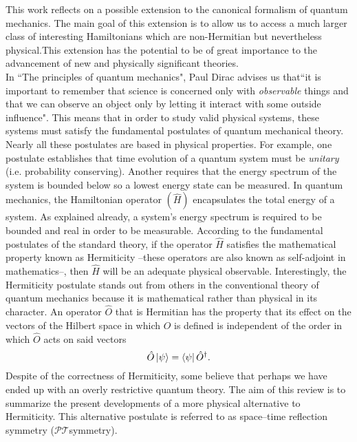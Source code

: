 \documentclass[12pt, a4paper]{report}
\newcommand\PT{\(\mathcal{PT}\)}
\begin{document}
This work reflects on a possible extension to the canonical formalism of quantum mechanics. The main goal of this extension is to allow us to access a much larger class of interesting Hamiltonians which are non-Hermitian but nevertheless physical.This extension has the potential to be of great importance to the advancement of new and physically significant theories.\\
In ``The principles of quantum mechanics", Paul Dirac advises us that``it is important to remember that science is concerned only with \textit{observable} things and that we can observe an object only by letting it interact with some outside influence"\cite{POQM}. This means that in order to study valid physical systems, these systems must satisfy the fundamental postulates of quantum mechanical theory. Nearly all these postulates are based in physical properties. For example, one postulate establishes that time evolution of a quantum system must be \textit{unitary} (i.e. probability conserving). Another requires that the energy spectrum of the system is bounded below so a lowest energy state can be measured. In quantum mechanics, the Hamiltonian operator $(\hat{H})$ encapsulates the total energy of a system. As explained already, a system's energy spectrum is required to be bounded and real in order to be measurable. According to the fundamental postulates of the standard theory, if the operator $\hat{H}$ satisfies the mathematical property known as Hermiticity --these operators are also known as self-adjoint in mathematics--, then $\hat{H}$ will be an adequate physical observable. Interestingly, the Hermiticity postulate stands out from others in the conventional theory of quantum mechanics because it is mathematical rather than physical in its character\cite{MakingSense}.
An operator $\hat{O}$ that is Hermitian has the property that its effect on the vectors of the Hilbert space in which $\hat{O}$ is defined is independent of the order in which $\hat{O}$ acts on said vectors\cite{Jones-Smith}
\begin{equation}\label{eq:1}
\hat{O}\ket{\psi} = \bra{\psi}\hat{O}^{\dagger}.
\end{equation}
Despite of the correctness of Hermiticity, some believe that perhaps we have ended up with an overly restrictive quantum theory.  
The aim of this review is to summarize the present developments of a more physical alternative to Hermiticity. This alternative postulate is referred to as space–time reflection symmetry (\PT\:symmetry)\cite{MustaHbeHermitian}. 
\end{document}
